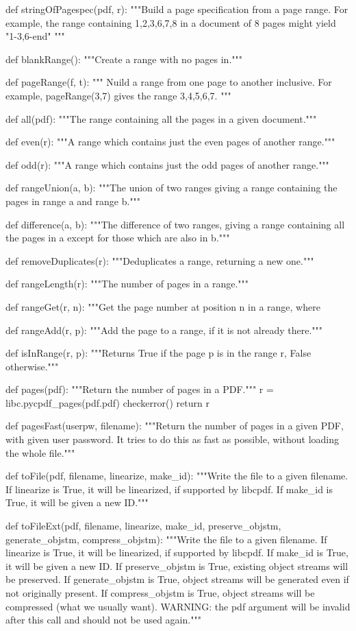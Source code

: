 def stringOfPagespec(pdf, r):
    """Build a page specification from a page
    range. For example, the range containing 1,2,3,6,7,8 in a document of 8
    pages might yield "1-3,6-end" """

def blankRange():
    """Create a range with no pages in."""

def pageRange(f, t):
    """ Nuild a range from one page to another inclusive.
    For example, pageRange(3,7) gives the range 3,4,5,6,7. """

def all(pdf):
    """The range containing all the pages in a given document."""

def even(r):
    """A range which contains just the even pages of another
    range."""

def odd(r):
    """A range which contains just the odd pages of another
    range."""

def rangeUnion(a, b):
    """The union of two ranges giving a range containing
    the pages in range a and range b."""

def difference(a, b):
    """The difference of two ranges, giving a range
    containing all the pages in a except for those which are also in b."""

def removeDuplicates(r):
    """Deduplicates a range, returning a new one."""

def rangeLength(r):
    """The number of pages in a range."""

def rangeGet(r, n):
    """Get the page number at position n in a range, where

def rangeAdd(r, p):
    """Add the page to a range, if it is not already
    there."""

def isInRange(r, p):
    """Returns True if the page p is in the range r, False otherwise."""

def pages(pdf):
    """Return the number of pages in a PDF."""
    r = libc.pycpdf_pages(pdf.pdf)
    checkerror()
    return r

def pagesFast(userpw, filename):
    """Return the number of pages in a given
    PDF, with given user password. It tries to do this as fast as
    possible, without loading the whole file."""

def toFile(pdf, filename, linearize, make_id):
    """Write the file to a given filename. If linearize is True, it will be
    linearized, if supported by libcpdf. If make_id is True, it will be given a
    new ID."""

def toFileExt(pdf, filename, linearize, make_id, preserve_objstm,
              generate_objstm, compress_objstm):
    """Write the file to a given filename. If linearize is True, it will be
    linearized, if supported by libcpdf. If make_id is True, it will be given a
    new ID.  If preserve_objstm is True, existing object streams will be
    preserved. If generate_objstm is True, object streams will be generated
    even if not originally present. If compress_objstm is True, object streams
    will be compressed (what we usually want). WARNING: the pdf argument will
    be invalid after this call and should not be used again."""


